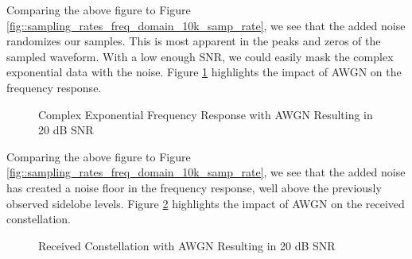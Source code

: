 \documentclass{article}
\begin{document}
Comparing the above figure to Figure \ref{fig::sampling_rates_freq_domain_10k_samp_rate}, we see that the added noise randomizes our samples. This is most apparent in the peaks and zeros of the sampled waveform. With a low enough SNR, we could easily mask the complex exponential data with the noise. Figure \ref{fig::noise_freq_domain_20dB_snr} highlights the impact of AWGN on the frequency response.

\begin{figure}[H]
	\centerline{}
	\caption{Complex Exponential Frequency Response with AWGN Resulting in 20 dB SNR}
	\label{fig::noise_freq_domain_20dB_snr}
\end{figure}

Comparing the above figure to Figure \ref{fig::sampling_rates_freq_domain_10k_samp_rate}, we see that the added noise has created a noise floor in the frequency response, well above the previously observed sidelobe levels. Figure \ref{fig::noise_constellation_20dB_snr} highlights the impact of AWGN on the received constellation.

\begin{figure}[H]
	\centerline{}
	\caption{Received Constellation with AWGN Resulting in 20 dB SNR}
	\label{fig::noise_constellation_20dB_snr}
\end{figure}
\end{document}
